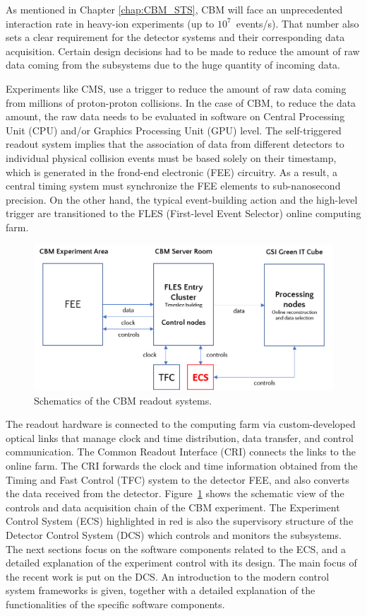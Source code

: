 
As mentioned in Chapter \ref{chap:CBM_STS}, \gls{CBM} will face an unprecedented interaction rate in heavy-ion experiments (up to $10^{7}$~events/s). That number also sets a clear requirement for the detector systems and their corresponding data acquisition. Certain design decisions had to be made to reduce the amount of raw data coming from the subsystems due to the huge quantity of incoming data.

Experiments like \gls{CMS}, use a trigger to \cite{CMS-DAQ} reduce the amount of raw data coming from millions of proton-proton collisions.  In the case of \gls{CBM}, to reduce the data amount, the raw data needs to be evaluated in software on Central Processing Unit (\gls{CPU}) and/or Graphics Processing Unit (\gls{GPU}) level. The self-triggered readout system implies that the association of data from different detectors to individual physical collision events must be based solely on their timestamp, which is generated in the frond-end electronic (\gls{FEE}) circuitry. As a result, a central timing system must synchronize the \gls{FEE} elements to sub-nanosecond precision. On the other hand, the typical event-building action and the high-level trigger are transitioned to the \gls{FLES} (First-level Event Selector) online computing farm. 


\begin{figure}[!h]
\centering
\includegraphics[width=0.7\columnwidth]{Chapter3/Controls/images/online.png}
\caption{Schematics of the CBM readout systems.}
\label{fig_controls}
\end{figure}

\newpage
The readout hardware is connected to the computing farm via custom-developed optical links that manage clock and time distribution, data transfer, and control communication. The Common Readout Interface (\gls{CRI}) connects the links to the online farm. The \gls{CRI} forwards the clock and time information obtained from the Timing and Fast Control (\gls{TFC}) system to the detector \gls{FEE}, and also converts the data received from the detector. Figure~\ref{fig_controls} shows the schematic view of the controls and data acquisition chain of the \gls{CBM} experiment. The Experiment Control System (\gls{ECS}) highlighted in red is also the supervisory structure of the Detector Control System (\gls{DCS}) which controls and monitors the subsystems. The next sections focus on the software components related to the \gls{ECS}, and a detailed explanation of the experiment control with its design. The main focus of the recent work is put on the \gls{DCS}. An introduction to the modern control system frameworks is given, together with a detailed explanation of the functionalities of the specific software components. 
